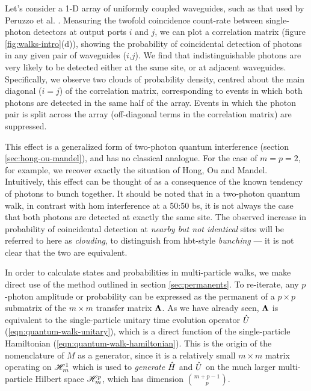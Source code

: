 Let's consider a 1-D array of uniformly coupled waveguides, such as that used by Peruzzo et al. \cite{Peruzzo2010}. Measuring the twofold coincidence count-rate between single-photon detectors at output ports $i$ and $j$, we can plot a correlation matrix (figure \ref{fig:walks-intro}(d)), showing the probability of coincidental detection of photons in any given pair of waveguides ($i$,$j$).  
We find that indistinguishable photons are very likely to be detected either at the same site, or at adjacent waveguides.  Specifically, we observe two clouds of probability density, centred about the main diagonal ($i=j$) of the correlation matrix, corresponding to events in which both photons are detected in the same half of the array.
Events in which the photon pair is split across the array (off-diagonal terms in the correlation matrix) are suppressed. 

This effect is a generalized form of two-photon quantum interference (section \ref{sec:hong-ou-mandel}),  and has no classical analogue. For the case of $m=p=2$, for example, we recover exactly the situation of Hong, Ou and Mandel. Intuitively, this effect can be thought of as a consequence of the known tendency of photons to bunch together. It should be noted that in a two-photon quantum walk, in contrast with \gls{hom} interference at a 50:50 \gls{bs}, it is not always the case that both photons are detected at exactly the same site. The observed increase in probability of coincidental detection at \emph{nearby but not identical} sites will be referred to here as \emph{clouding}, to distinguish from \gls{hbt}-style \emph{bunching} --- it is not clear that the two are equivalent.

In order to calculate states and probabilities in multi-particle walks, we make direct use of the method outlined in section \ref{sec:permanents}. To re-iterate, any $p$-photon amplitude or probability can be expressed as the permanent of a $p\times p$ submatrix of the $m \times m$ transfer matrix $\mathbf{\Lambda}$. As we have already seen, $\mathbf{\Lambda}$ is equivalent to the single-particle unitary time evolution operator $\hat{U}$ (\ref{eqn:quantum-walk-unitary}), which is a direct function of the single-particle Hamiltonian (\ref{eqn:quantum-walk-hamiltonian}). This is the origin of the nomenclature of $M$ as a generator, since it is a relatively small $m \times m$ matrix operating on $\mathscr{H}_m^1$ which is used to \emph{generate} $\hat{H}$ and $\hat{U}$ on the much larger multi-particle Hilbert space $\mathscr{H}_m^p$, which has dimension $\binom{m+p-1}{p}$.

